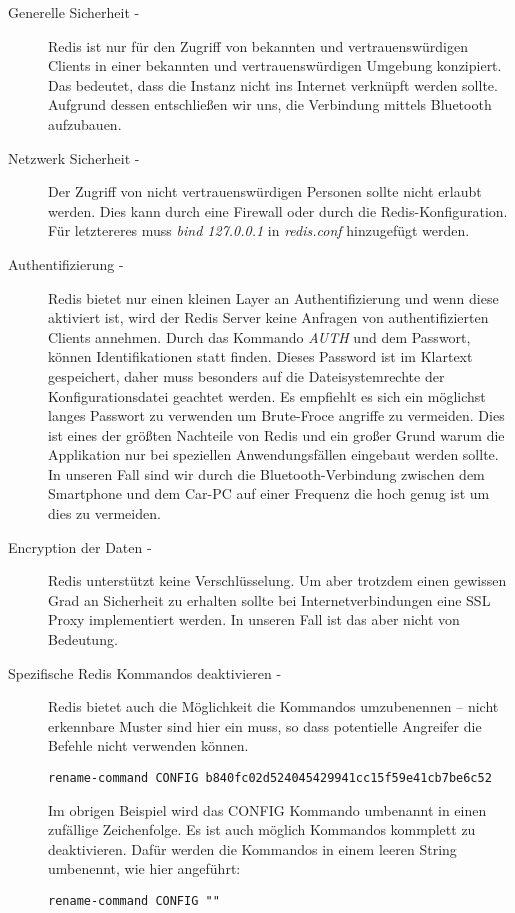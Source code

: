 \begin{description}
\item[Generelle Sicherheit - \newline]
Redis ist nur für den Zugriff von bekannten und vertrauenswürdigen Clients in einer bekannten und vertrauenswürdigen Umgebung konzipiert. Das bedeutet, dass die Instanz nicht ins Internet verknüpft werden sollte. Aufgrund dessen entschließen wir uns, die Verbindung mittels Bluetooth aufzubauen.

\item[Netzwerk Sicherheit - \newline]
Der Zugriff von nicht vertrauenswürdigen Personen sollte nicht erlaubt werden. Dies kann durch eine Firewall oder durch die Redis-Konfiguration. Für letztereres muss \textit{bind 127.0.0.1} in \textit{redis.conf} hinzugefügt werden.

\item[Authentifizierung - \newline]
Redis bietet nur einen kleinen Layer an Authentifizierung und wenn diese aktiviert ist, wird der Redis Server keine Anfragen von authentifizierten Clients annehmen. Durch das Kommando \textit{AUTH} und dem Passwort, können Identifikationen statt finden. Dieses Password ist im Klartext gespeichert, daher muss besonders auf die Dateisystemrechte der Konfigurationsdatei geachtet werden. Es empfiehlt es sich ein möglichst langes Passwort zu verwenden um Brute-Froce angriffe zu vermeiden. Dies ist eines der größten Nachteile von Redis und ein großer Grund warum die Applikation nur bei speziellen Anwendungsfällen eingebaut werden sollte. In unseren Fall sind wir durch die Bluetooth-Verbindung zwischen dem Smartphone und dem Car-PC auf einer Frequenz die hoch genug ist um dies zu vermeiden. 

\item[Encryption der Daten - \newline]
Redis unterstützt keine Verschlüsselung. Um aber trotzdem einen gewissen Grad an Sicherheit zu erhalten sollte bei Internetverbindungen eine SSL Proxy implementiert werden. In unseren Fall ist das aber nicht von Bedeutung.

\item[Spezifische Redis Kommandos deaktivieren - \newline]
Redis bietet auch die Möglichkeit die Kommandos umzubenennen – nicht erkennbare Muster sind hier ein muss, so dass potentielle Angreifer die Befehle nicht verwenden können.

\lstinline{rename-command CONFIG b840fc02d524045429941cc15f59e41cb7be6c52}

Im obrigen Beispiel wird das CONFIG Kommando umbenannt in einen zufällige Zeichenfolge. Es ist auch möglich Kommandos kommplett zu deaktivieren. Dafür werden die Kommandos in einem leeren String umbenennt, wie hier angeführt:

\lstinline{rename-command CONFIG ""}
\end{description}